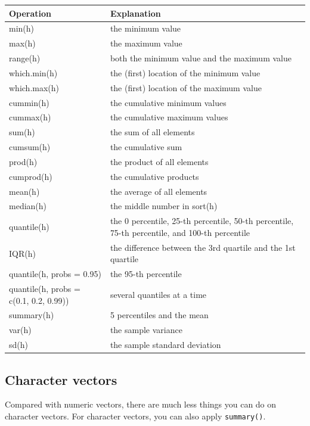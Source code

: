 \documentclass[
]{book}
\begin{document}
\begin{tabular}{l|l}
\hline
Operation & Explanation\\
\hline
min(h) & the minimum value\\
\hline
max(h) & the maximum value\\
\hline
range(h) & both the minimum value and the maximum value\\
\hline
which.min(h) & the (first) location of the minimum value\\
\hline
which.max(h) & the (first) location of the maximum value\\
\hline
cummin(h) & the cumulative minimum values\\
\hline
cummax(h) & the cumulative maximum values\\
\hline
sum(h) & the sum of all elements\\
\hline
cumsum(h) & the cumulative sum\\
\hline
prod(h) & the product of all elements\\
\hline
cumprod(h) & the cumulative products\\
\hline
mean(h) & the average of all elements\\
\hline
median(h) & the middle number in sort(h)\\
\hline
quantile(h) & the 0 percentile, 25-th percentile, 50-th percentile, 75-th percentile, and 100-th percentile\\
\hline
IQR(h) & the difference between the 3rd quartile and the 1st quartile\\
\hline
quantile(h, probs = 0.95) & the 95-th percentile\\
\hline
quantile(h, probs = c(0.1, 0.2, 0.99)) & several quantiles at a time\\
\hline
summary(h) & 5 percentiles and the mean\\
\hline
var(h) & the sample variance\\
\hline
sd(h) & the sample standard deviation\\
\hline
\end{tabular}

\hypertarget{character-vectors}{%
\subsection{Character vectors}\label{character-vectors}}

Compared with numeric vectors, there are much less things you can do on character vectors. For character vectors, you can also apply \texttt{summary()}.
\end{document}
